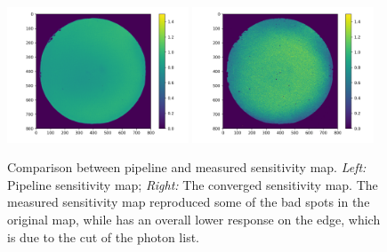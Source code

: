 \documentclass[12pt, preprint]{aastex}
\begin{document}
\begin{figure}[p]
\begin{center}
\includegraphics[width=0.48\textwidth]{figures/flato}
\includegraphics[width=0.48\textwidth]{figures/flat}
\end{center}
\caption{
  \label{flat}
  Comparison between pipeline and measured sensitivity map.
  \emph{Left:} Pipeline sensitivity map;
  \emph{Right:} The converged sensitivity map.
  The measured sensitivity map reproduced some of the bad spots in the original map, while has an overall lower response on the edge, which is due to the cut of the photon list.
}
\end{figure}
\end{document}
